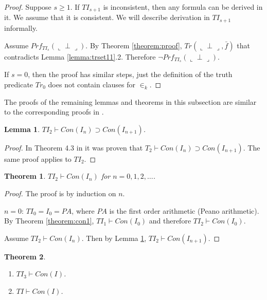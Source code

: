 \documentclass{asl}
\newtheorem{theorem}{Theorem}[section]
\newtheorem{lemma}{Lemma}[section]
\theoremstyle{definition}
\begin{document}
\begin{proof}
Suppose $s\geqslant 1$. If $TI_{s+1}$ is inconsistent, then any formula can be derived in it. We assume that it is consistent. We will describe derivation in $TI_{s+1}$ informally. 

Assume $Prf_{TI_s}(\llcorner \perp \lrcorner)$. By Theorem \ref{theorem:proof}, $Tr(\llcorner \perp \lrcorner,\bar{f}) $ that contradicts Lemma \ref{lemma:trset11}.2. Therefore $\neg Prf_{TI_s}(\llcorner \perp \lrcorner)$.

If $s=0$, then the proof has similar steps, just the definition of the truth predicate $Tr_0 $  does not contain clauses for $\in_k$.
\end{proof}

The proofs of the remaining lemmas and theorems in this subsection are similar to the corresponding proofs in \cite{mcnt53}.

\begin{lemma}
$TI_2\vdash Con(I_n)\supset Con(I_{n+1})$.
\label{lemma:con}
\end{lemma}

\begin{proof}

In Theorem 4.3 in \cite{mcnt53} it was proven that $T_2\vdash Con(I_n)\supset Con(I_{n+1})$. The same proof applies to $TI_2$.
\end{proof}

\begin{theorem}
$TI_2\vdash Con(I_n)$ for $n=0,1,2,\ldots$.
\label{theorem:con2}
\end{theorem}

\begin{proof}
The proof is by induction on $n$. 

$n=0$: $TI_0=I_0=PA$, where $PA$ is the first order arithmetic (Peano arithmetic).
By Theorem \ref{theorem:con1}, $TI_1\vdash Con(I_0)$ and therefore $TI_2\vdash Con(I_0)$. 

Assume $TI_2\vdash Con(I_n)$. Then by Lemma \ref{lemma:con}, $TI_2\vdash Con(I_{n+1})$.
\end{proof}

\begin{theorem}
\begin{enumerate}
\item $TI_3\vdash Con(I)$.
\item $TI\vdash Con(I)$.
\end{enumerate}
\label{theorem:con3}
\end{theorem}
\end{document}
